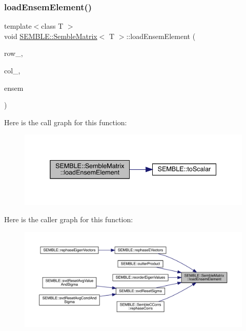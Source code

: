 \subsubsection{\texorpdfstring{loadEnsemElement()}{loadEnsemElement()}\hspace{0.1cm}{\footnotesize\ttfamily [2/2]}}
{\footnotesize\ttfamily template$<$class T $>$ \\
void \mbox{\hyperlink{structSEMBLE_1_1SembleMatrix}{S\+E\+M\+B\+L\+E\+::\+Semble\+Matrix}}$<$ T $>$\+::load\+Ensem\+Element (\begin{DoxyParamCaption}\item[{int}]{row\+\_\+,  }\item[{int}]{col\+\_\+,  }\item[{const typename \mbox{\hyperlink{structSEMBLE_1_1PromoteEnsem}{Promote\+Ensem}}$<$ T $>$\+::Type \&}]{ensem }\end{DoxyParamCaption})}

Here is the call graph for this function\+:
\nopagebreak
\begin{figure}[H]
\begin{center}
\leavevmode
\includegraphics[width=338pt]{df/d87/structSEMBLE_1_1SembleMatrix_a84fd4f9ffc4012e6e09faa054ed57908_cgraph}
\end{center}
\end{figure}
Here is the caller graph for this function\+:
\nopagebreak
\begin{figure}[H]
\begin{center}
\leavevmode
\includegraphics[width=350pt]{df/d87/structSEMBLE_1_1SembleMatrix_a84fd4f9ffc4012e6e09faa054ed57908_icgraph}
\end{center}
\end{figure}
\mbox{\label{structSEMBLE_1_1SembleMatrix_a53a5289f03357a50c6504282100e4237}} 
